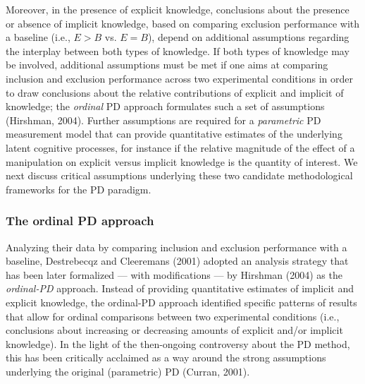 \documentclass[floatsintext,doc]{apa6}
\theoremstyle{definition}
\theoremstyle{definition}
\theoremstyle{definition}
\theoremstyle{remark}
\begin{document}
Moreover, in the presence of explicit knowledge, conclusions about the
presence or absence of implicit knowledge, based on comparing exclusion
performance with a baseline (i.e., \(E>B\) vs. \(E=B\)), depend on
additional assumptions regarding the interplay between both types of
knowledge. If both types of knowledge may be involved, additional
assumptions must be met if one aims at comparing inclusion and exclusion
performance across two experimental conditions in order to draw
conclusions about the relative contributions of explicit and implicit of
knowledge; the \emph{ordinal} PD approach formulates such a set of
assumptions (Hirshman, 2004). Further assumptions are required for a
\emph{parametric} PD measurement model that can provide quantitative
estimates of the underlying latent cognitive processes, for instance if
the relative magnitude of the effect of a manipulation on explicit
versus implicit knowledge is the quantity of interest. We next discuss
critical assumptions underlying these two candidate methodological
frameworks for the PD paradigm.

\subsubsection{The ordinal PD approach}\label{the-ordinal-pd-approach}

Analyzing their data by comparing inclusion and exclusion performance
with a baseline, Destrebecqz and Cleeremans (2001) adopted an analysis
strategy that has been later formalized --- with modifications --- by
Hirshman (2004) as the \emph{ordinal-PD} approach. Instead of providing
quantitative estimates of implicit and explicit knowledge, the
ordinal-PD approach identified specific patterns of results that allow
for ordinal comparisons between two experimental conditions (i.e.,
conclusions about increasing or decreasing amounts of explicit and/or
implicit knowledge). In the light of the then-ongoing controversy about
the PD method, this has been critically acclaimed as a way around the
strong assumptions underlying the original (parametric) PD (Curran,
2001).
\end{document}

